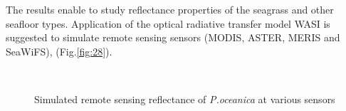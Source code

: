 \documentclass[10pt, a4paper]{article}
\begin{document}
The results enable to study reflectance properties of the seagrass and other
seafloor types. Application of the optical radiative transfer model WASI is suggested to simulate
remote sensing sensors (MODIS, ASTER, MERIS and SeaWiFS), (Fig.\ref{fig:28}).

\begin{figure}[h]
	\centering
	\\
	\caption{Simulated remote sensing reflectance of \textit{P.oceanica} at various sensors}
	\label{fig:29}
\end{figure}
\end{document}

